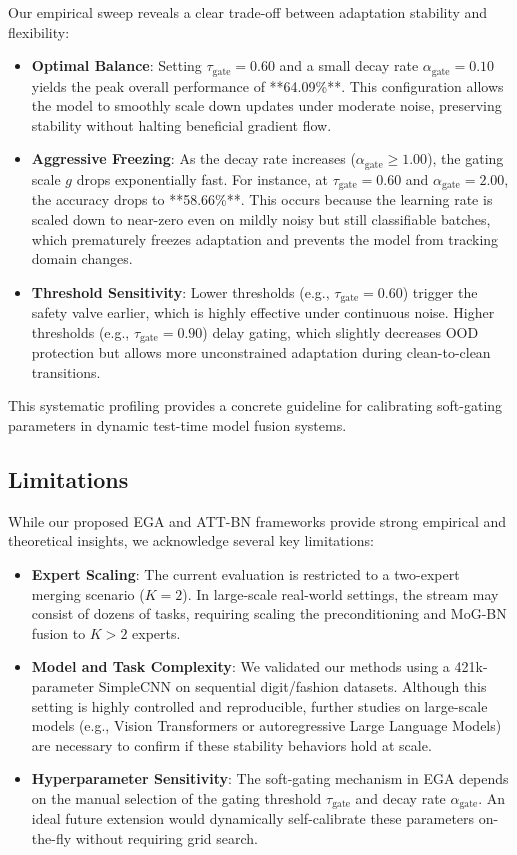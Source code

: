 \documentclass{article}
\theoremstyle{plain}
\theoremstyle{definition}
\theoremstyle{remark}
\begin{document}
Our empirical sweep reveals a clear trade-off between adaptation stability and flexibility:
\begin{itemize}
    \item \textbf{Optimal Balance}: Setting $\tau_{\text{gate}} = 0.60$ and a small decay rate $\alpha_{\text{gate}} = 0.10$ yields the peak overall performance of **64.09\%**. This configuration allows the model to smoothly scale down updates under moderate noise, preserving stability without halting beneficial gradient flow.
    \item \textbf{Aggressive Freezing}: As the decay rate increases ($\alpha_{\text{gate}} \ge 1.00$), the gating scale $g$ drops exponentially fast. For instance, at $\tau_{\text{gate}} = 0.60$ and $\alpha_{\text{gate}} = 2.00$, the accuracy drops to **58.66\%**. This occurs because the learning rate is scaled down to near-zero even on mildly noisy but still classifiable batches, which prematurely freezes adaptation and prevents the model from tracking domain changes.
    \item \textbf{Threshold Sensitivity}: Lower thresholds (e.g., $\tau_{\text{gate}} = 0.60$) trigger the safety valve earlier, which is highly effective under continuous noise. Higher thresholds (e.g., $\tau_{\text{gate}} = 0.90$) delay gating, which slightly decreases OOD protection but allows more unconstrained adaptation during clean-to-clean transitions.
\end{itemize}
This systematic profiling provides a concrete guideline for calibrating soft-gating parameters in dynamic test-time model fusion systems.

\subsection{Limitations}
While our proposed EGA and ATT-BN frameworks provide strong empirical and theoretical insights, we acknowledge several key limitations:
\begin{itemize}
    \item \textbf{Expert Scaling}: The current evaluation is restricted to a two-expert merging scenario ($K=2$). In large-scale real-world settings, the stream may consist of dozens of tasks, requiring scaling the preconditioning and MoG-BN fusion to $K > 2$ experts.
    \item \textbf{Model and Task Complexity}: We validated our methods using a 421k-parameter SimpleCNN on sequential digit/fashion datasets. Although this setting is highly controlled and reproducible, further studies on large-scale models (e.g., Vision Transformers or autoregressive Large Language Models) are necessary to confirm if these stability behaviors hold at scale.
    \item \textbf{Hyperparameter Sensitivity}: The soft-gating mechanism in EGA depends on the manual selection of the gating threshold $\tau_{\text{gate}}$ and decay rate $\alpha_{\text{gate}}$. An ideal future extension would dynamically self-calibrate these parameters on-the-fly without requiring grid search.
\end{itemize}
\end{document}
